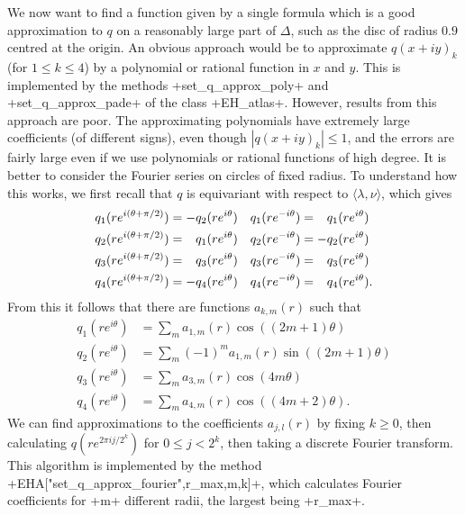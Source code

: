 \documentclass[reqno]{amsart}
\newcommand{\Dl}        {\Delta}
\newcommand{\tht}       {\theta}
\newcommand{\lm}        {\lambda}
\newcommand{\ip}[1]     {\langle #1\rangle}
\newcommand{\pp}        {\hphantom{+}}
\renewcommand{\:}{\colon}
\theoremstyle{definition}
\begin{document}
We now want to find a function given by a single formula which is a
good approximation to $q$ on a reasonably large part of $\Dl$, such as
the disc of radius $0.9$ centred at the origin.  An obvious approach
would be to approximate $q(x+iy)_k$ (for $1\leq k\leq 4$) by a
polynomial or rational function in $x$ and $y$.  This is implemented
by the methods \mcode+set_q_approx_poly+ and \mcode+set_q_approx_pade+
of the class \mcode+EH_atlas+.  However, results from this
approach are poor.  The approximating polynomials have extremely large
coefficients (of different signs), even though $|q(x+iy)_k|\leq 1$,
and the errors are fairly large even if we use polynomials or rational
functions of high degree.  It is better to consider the Fourier series
on circles of fixed radius.  To understand how this works, we first
recall that $q$ is equivariant with respect to $\ip{\lm,\nu}$, which
gives
\begin{align*}
 q_1(re^{i(\tht+\pi/2)}) &=    -q_2(re^{i\tht}) &
 q_1(re^{-i\tht})        &= \pp q_1(re^{i\tht}) \\
 q_2(re^{i(\tht+\pi/2)}) &= \pp q_1(re^{i\tht}) &
 q_2(re^{-i\tht})        &=    -q_2(re^{i\tht}) \\
 q_3(re^{i(\tht+\pi/2)}) &= \pp q_3(re^{i\tht}) &
 q_3(re^{-i\tht})        &= \pp q_3(re^{i\tht}) \\
 q_4(re^{i(\tht+\pi/2)}) &=    -q_4(re^{i\tht}) &
 q_4(re^{-i\tht})        &= \pp q_4(re^{i\tht}).
\end{align*}
From this it follows that there are functions $a_{k,m}(r)$ such that
\begin{align*}
 q_1(r e^{i\tht}) &= \sum_m a_{1,m}(r) \cos((2m+1)\tht) \\
 q_2(r e^{i\tht}) &= \sum_m (-1)^m a_{1,m}(r) \sin((2m+1)\tht) \\
 q_3(r e^{i\tht}) &= \sum_m a_{3,m}(r) \cos(4m\tht) \\
 q_4(r e^{i\tht}) &= \sum_m a_{4,m}(r) \cos((4m+2)\tht).
\end{align*}
We can find approximations to the coefficients $a_{j,l}(r)$ by fixing
$k\geq 0$, then calculating $q(re^{2\pi ij/2^k})$ for $0\leq j<2^k$, then
taking a discrete Fourier transform.  This algorithm is implemented by the
method \mcode+EHA["set_q_approx_fourier",r_max,m,k]+, which calculates
Fourier coefficients for \mcode+m+ different radii, the largest being
\mcode+r_max+.
\end{document}
